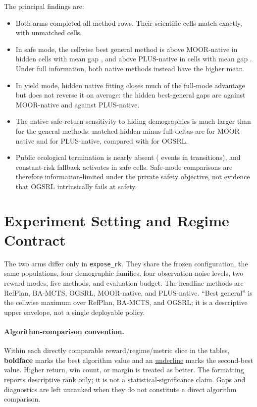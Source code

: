\documentclass[11pt]{article}
\begin{document}
The principal findings are:
\begin{itemize}
    \item Both arms completed all \ReportRowsPerRegime{} method rows.  Their
    \ReportMatchedCells{} scientific cells match exactly, with
    \ReportUnmatchedCells{} unmatched cells.
    \item In safe mode, the cellwise best general method is above MOOR-native
    in \SafeHiddenMoorWins{} hidden cells with mean gap
    \SafeHiddenMoorGap{}, and above PLUS-native in
    \SafeHiddenPlusWins{} cells with mean gap \SafeHiddenPlusGap{}.
    Under full information, both native methods instead have the higher mean.
    \item In yield mode, hidden native fitting closes much of the full-mode
    advantage but does not reverse it on average: the hidden best-general gaps
    are \YieldHiddenMoorGap{} against MOOR-native and
    \YieldHiddenPlusGap{} against PLUS-native.
    \item The native safe-return sensitivity to hiding demographics is much
    larger than for the general methods: matched hidden-minus-full deltas are
    \SafeMoorDelta{} for MOOR-native and \SafePlusDelta{} for PLUS-native,
    compared with \SafeOgsrlDelta{} for OGSRL.
    \item Public ecological termination is nearly absent
    (\TerminationEvents{} events in \TerminationTransitions{} transitions),
    and constant-risk fallback activates in \RiskFallbackCells{} safe cells.
    Safe-mode comparisons are therefore information-limited under the private
    safety objective, not evidence that OGSRL intrinsically fails at safety.
\end{itemize}

\section{Experiment Setting and Regime Contract}

The two arms differ only in \texttt{expose\_rk}.  They share the frozen
configuration, the same \ReportPopulationCount{} populations, four demographic families, four
observation-noise levels, two reward modes, five methods, and evaluation
budget.  The headline methods are RefPlan, BA-MCTS, OGSRL, MOOR-native, and
PLUS-native.  ``Best general'' is the cellwise maximum over RefPlan, BA-MCTS,
and OGSRL; it is a descriptive upper envelope, not a single deployable policy.

\paragraph{Algorithm-comparison convention.}
Within each directly comparable reward/regime/metric slice in the tables,
\textbf{boldface} marks the best algorithm value and an
\underline{underline} marks the second-best value.  Higher return, win count,
or margin is treated as better.  The formatting reports descriptive rank only;
it is not a statistical-significance claim.  Gaps and diagnostics are left
unranked when they do not constitute a direct algorithm comparison.
\end{document}
